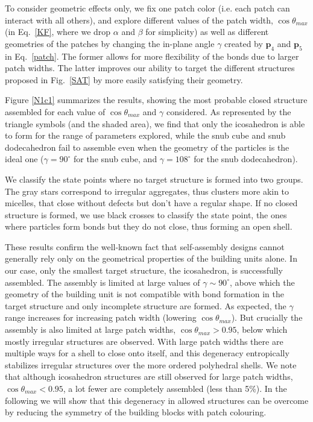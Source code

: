 \documentclass[a4paper, amsfonts, amssymb, amsmath, reprint, showkeys, nofootinbib, oneside]{revtex4-1}
\begin{document}
To consider geometric effects only, we fix one patch color (i.e. each patch can interact with all others), and explore different values of the patch width, $\cos\theta_{max}$ (in Eq.~\ref{KF}, where we drop $\alpha$ and $\beta$ for simplicity) as well as different geometries of the patches by changing the in-plane angle $\gamma$ created by $\textbf{p}_4$ and $\textbf{p}_5$ in Eq.~\ref{patch}. The former allows for more flexibility of the bonds due to larger patch widths. The latter improves our ability to target the different structures proposed in Fig.~\ref{SAT} by more easily satisfying their geometry.

Figure \ref{N1c1} summarizes the results, showing the most probable closed structure assembled for each value of $\cos\theta_{max}$ and $\gamma$ considered. As represented by the triangle symbols (and the shaded area), we find that only the icosahedron is able to form for the range of parameters explored, while the snub cube and snub dodecahedron fail to assemble even when the geometry of the particles is the ideal one ($\gamma=90^\circ$ for the snub cube, and  $\gamma=108^\circ$ for the snub dodecahedron).

We classify the state points where no target structure is formed into two groups. The gray stars correspond to irregular aggregates, thus clusters more akin to micelles, that close without defects but don't have a regular shape. If no closed structure is formed, we use black crosses to classify the state point, the ones where particles form bonds but they do not close, thus forming an open shell.

These results confirm the well-known fact that self-assembly designs cannot generally rely only on the geometrical properties of the building units alone. In our case, only the smallest target structure, the icosahedron, is successfully assembled. The assembly is limited at large values of $\gamma\sim 90^\circ$, above which the geometry of the building unit is not compatible with bond formation in the target structure and only incomplete structure are formed. As expected, the $\gamma$ range increases for increasing patch width (lowering $\cos\theta_{max}$). But crucially the assembly is also limited at large patch widths, $\cos\theta_{max}>0.95$, below which mostly irregular structures are observed. With large patch widths there are multiple ways for a shell to close onto itself, and this degeneracy entropically stabilizes irregular structures over the more ordered polyhedral shells. We note that although icosahedron structures are still observed for large patch widths, $\cos\theta_{max}<0.95$, a lot fewer are completely assembled (less than 5\%). In the following we will show that this degeneracy in allowed structures can be overcome by reducing the symmetry of the building blocks with patch colouring.
\end{document}
